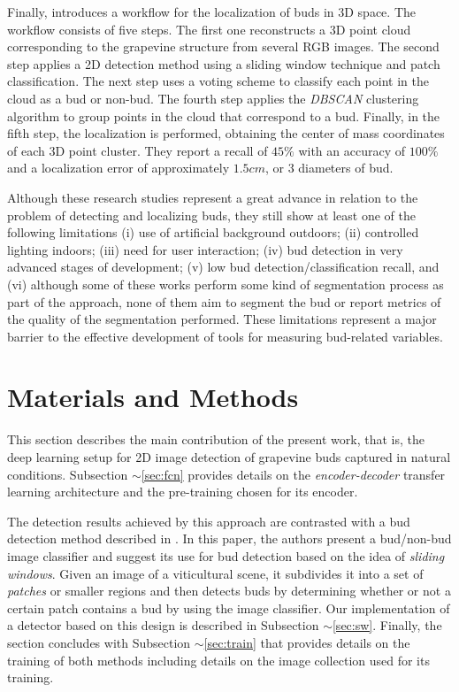 \documentclass[a4paper,authoryear,review]{elsarticle}
\begin{document}
Finally, \citet{diaz2018grapevine} introduces a workflow for the localization of buds in 3D space. The workflow consists of five steps. The first one reconstructs a 3D point cloud corresponding to the grapevine structure from several RGB images. The second step applies a 2D detection method using a sliding window technique and patch classification. The next step uses a voting scheme to classify each point in the cloud as a bud or non-bud. The fourth step applies the \emph{DBSCAN} clustering algorithm to group points in the cloud that correspond to a bud. Finally, in the fifth step, the localization is performed, obtaining the center of mass coordinates of each 3D point cluster. They report a recall of $45\%$ with an accuracy of $100\%$ and a localization error of approximately $1.5cm$, or 3 diameters of bud.  

Although these research studies represent a great advance in relation to the problem of detecting and localizing buds, they still show at least one of the following limitations (i) use of artificial background outdoors; (ii) controlled lighting indoors; (iii) need for user interaction; (iv) bud detection in very advanced stages of development; (v) low bud detection/classification recall, and (vi) although some of these works perform some kind of segmentation process as part of the approach, none of them aim to segment the bud or report metrics of the quality of the segmentation performed. These limitations represent a major barrier to the effective development of tools for measuring bud-related variables. 

\section{Materials and Methods}
\label{sec:matmet}

This section describes the main contribution of the present work, that is, the deep learning setup for 2D image detection of grapevine buds captured in natural conditions. Subsection $\sim$\ref{sec:fcn} provides details on the \emph{encoder-decoder} transfer learning architecture and the pre-training chosen for its encoder. 

The detection results achieved by this approach are contrasted with a bud detection method described in  \citet{perez2017image}. In this paper, the authors present a bud/non-bud image classifier and suggest its use for bud detection based on the idea of \emph{sliding windows}. Given an image of a viticultural scene, it subdivides it into a set of \emph{patches} or smaller regions \citep{perez2017image} and then detects buds by determining whether or not a certain patch contains a bud by using the image classifier. Our implementation of a detector based on this design is described in Subsection $\sim$\ref{sec:sw}. Finally, the section concludes with Subsection $\sim$\ref{sec:train} that provides details on the training of both methods including details on the  image collection used for its training. 
\end{document}
